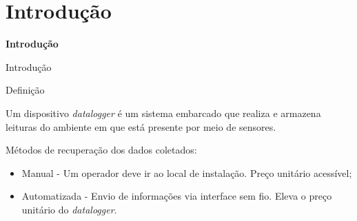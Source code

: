 \section{Introdução}


\begin{frame}
    
    \centering
    \color{blue_theme}\huge{\textbf{Introdução}}

\end{frame}



\begin{frame}{Introdução}
    \begin{block}{Definição}
        
        Um dispositivo \textit{datalogger} é um sistema embarcado que realiza e 
        armazena leituras do ambiente em que está presente por meio de sensores.
        
    \end{block}






\end{frame}

\begin{frame}  

    Métodos de recuperação dos dados coletados: 
    
    \begin{itemize}
        \item Manual - Um operador deve ir ao local de instalação. Preço unitário acessível;  
        \item Automatizada - Envio de informações via interface sem fio. Eleva o preço unitário do \textit{datalogger}.
    \end{itemize}

\end{frame}    
    

